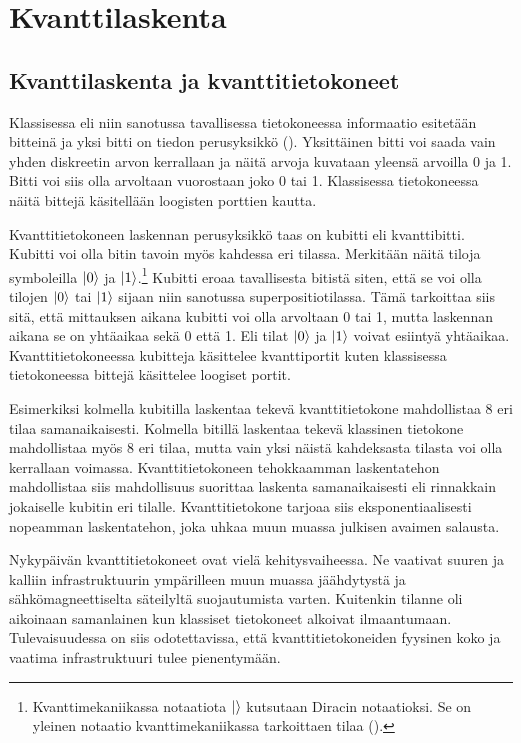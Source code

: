 \chapter{Kvanttilaskenta}

\section{Kvanttilaskenta ja kvanttitietokoneet}
Klassisessa eli niin sanotussa tavallisessa tietokoneessa informaatio esitetään bitteinä ja yksi bitti on tiedon perusyksikkö (\cite{doi:10.1080/23742917.2016.1226650}). Yksittäinen bitti voi saada vain yhden diskreetin arvon kerrallaan ja näitä arvoja kuvataan yleensä arvoilla 0 ja 1. Bitti voi siis olla arvoltaan vuorostaan joko 0 tai 1. Klassisessa tietokoneessa näitä bittejä käsitellään loogisten porttien kautta.

Kvanttitietokoneen laskennan perusyksikkö taas on kubitti eli kvanttibitti. Kubitti voi olla bitin tavoin myös kahdessa eri tilassa. Merkitään näitä tiloja symboleilla
$\ket{0}$ ja $\ket{1}$.\footnote{Kvanttimekaniikassa notaatiota $\ket{}$ kutsutaan Diracin notaatioksi. Se on yleinen notaatio kvanttimekaniikassa tarkoittaen tilaa (\cite{nielsen2001quantum}).} Kubitti eroaa tavallisesta bitistä siten, että se voi olla tilojen $\ket{0}$ tai $\ket{1}$ sijaan niin sanotussa superpositiotilassa. Tämä tarkoittaa siis sitä, että mittauksen aikana kubitti voi olla arvoltaan 0 tai 1, mutta laskennan aikana se on yhtäaikaa sekä 0 että 1. Eli tilat $\ket{0}$ ja $\ket{1}$ voivat esiintyä yhtäaikaa. Kvanttitietokoneessa kubitteja käsittelee kvanttiportit kuten klassisessa tietokoneessa bittejä käsittelee loogiset portit.

Esimerkiksi kolmella kubitilla laskentaa tekevä kvanttitietokone mahdollistaa 8 eri tilaa samanaikaisesti. Kolmella bitillä laskentaa tekevä klassinen tietokone mahdollistaa myös 8 eri tilaa, mutta vain yksi näistä kahdeksasta tilasta voi olla kerrallaan voimassa. Kvanttitietokoneen tehokkaamman laskentatehon mahdollistaa siis mahdollisuus suorittaa laskenta samanaikaisesti eli rinnakkain jokaiselle kubitin eri tilalle. Kvanttitietokone tarjoaa siis eksponentiaalisesti nopeamman laskentatehon, joka uhkaa muun muassa julkisen avaimen salausta.

Nykypäivän kvanttitietokoneet ovat vielä kehitysvaiheessa. Ne vaativat suuren ja kalliin infrastruktuurin ympärilleen muun muassa jäähdytystä ja sähkömagneettiselta säteilyltä suojautumista varten. Kuitenkin tilanne oli aikoinaan samanlainen kun klassiset tietokoneet alkoivat ilmaantumaan. Tulevaisuudessa on siis odotettavissa, että kvanttitietokoneiden fyysinen koko ja vaatima infrastruktuuri tulee pienentymään.

